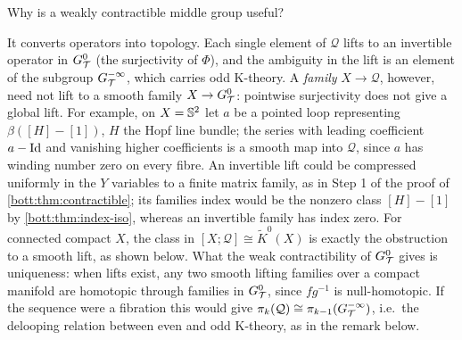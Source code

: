 \begin{question}
  Why is a weakly contractible middle group useful?
\end{question}
\begin{answer}
  It converts operators into topology. Each single element of $\mathcal Q$ lifts
  to an invertible operator in $G^{0}_{\mathcal{T}}$ (the surjectivity of $\Phi$), and the
  ambiguity in the lift is an element of the subgroup $G^{-\infty}_{\mathcal{T}}$, which carries odd
  K-theory. A \emph{family} $X\to\mathcal Q$, however, need not lift to a smooth
  family $X\to G^{0}_{\mathcal{T}}$: pointwise surjectivity does not give a global lift. For
  example, on $X=\mathbb{S}^2$ let $a$ be a pointed loop representing
  $\beta([H]-[1])$, $H$ the Hopf line bundle; the series with leading coefficient
  $a-\operatorname{Id}$ and vanishing higher coefficients is a smooth map into $\mathcal Q$,
  since $a$ has winding number zero on every fibre. An invertible lift could be
  compressed uniformly in the $Y$ variables to a finite matrix family, as in Step 1
  of the proof of \cref{bott:thm:contractible}; its families index would be the
  nonzero class $[H]-[1]$ by \cref{bott:thm:index-iso}, whereas an invertible
  family has index zero. For connected compact $X$, the class in
  $[X;\mathcal Q]\cong\tilde K^0(X)$ is exactly the obstruction to a
  smooth lift, as shown below. What the weak contractibility of $G^{0}_{\mathcal{T}}$
  gives is uniqueness: when lifts exist, any two smooth lifting families over a
  compact manifold are homotopic through families in $G^{0}_{\mathcal{T}}$, since $fg^{-1}$ is
  null-homotopic. If the sequence were a fibration this would give
  $\pi_k(\mathcal Q)\cong\pi_{k-1}(G^{-\infty}_{\mathcal{T}})$, i.e.\ the delooping relation
  between even and odd K-theory, as in the remark below.
\end{answer}
